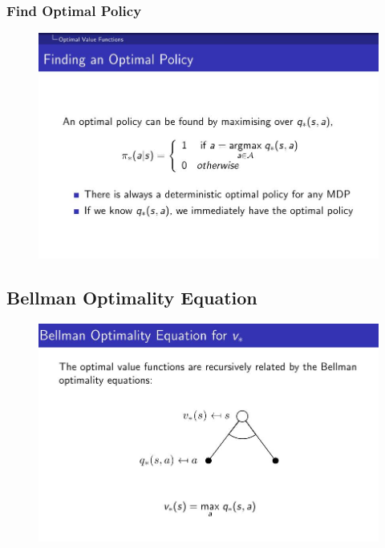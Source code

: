 \documentclass[10pt, a4paper, twocolumn]{article} %
\begin{document}
\subsubsection{Find Optimal Policy}
\begin{figure}[H]
	\begin{centering}
		\includegraphics[width = \linewidth]{findopt.jpg}
	\end{centering}
\end{figure}

\subsection{Bellman Optimality Equation}

\begin{figure}[H]
	\begin{centering}
		\includegraphics[width = \linewidth]{bellmanOptV.jpg}
	\end{centering}
\end{figure}
\end{document}
